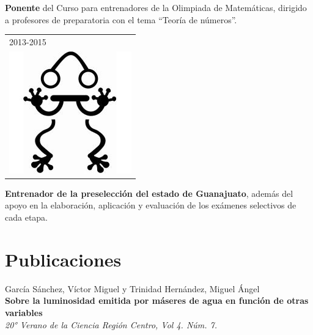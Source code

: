 \documentclass[]{friggeri-cv}
\begin{document}
\begin{entrylist}
{\begin{tabular}{l}
	\end{tabular}
    }
    {\vspace{-1.4cm}}
    { }
    {\textbf{Ponente} del Curso para entrenadores de la Olimpiada de Matemáticas, dirigido a profesores de preparatoria con el tema “Teoría de números”.}
    \entry
     {   \begin{tabular}{l}
    		\hspace{0.3cm}2013-2015\\
     		\hspace{0.5cm}\includegraphics[scale=0.23]{img/ommgto.jpg}
	\end{tabular}
    }
    {\vspace{-1.27cm}}
    { }
    {\textbf{Entrenador de la preselección del estado de Guanajuato}, además del apoyo en la elaboración, aplicación y evaluación de los exámenes selectivos de cada etapa.}
\end{entrylist}
\vspace{-0.5cm}
\section{Publicaciones}
\vspace{-0.4cm}
García Sánchez, Víctor Miguel y Trinidad Hernández, Miguel Ángel\\
\textbf{Sobre la luminosidad emitida por máseres de agua en función de otras variables}\\
\emph{20° Verano de la Ciencia Región Centro, Vol 4. Núm. 7.}
\end{document}
